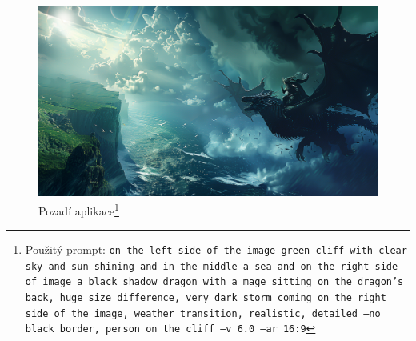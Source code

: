 \begin{figure}
  \begin{minipage}{\textwidth}
    \centering
    \includegraphics[width=\textwidth]{resources/figures/background.png}
    \caption[Pozadí aplikace]{Pozadí aplikace\footnote[3]{Použitý prompt: \texttt{on the left side of the image green cliff with clear sky and sun shining and in the middle a~sea and on the right side of image a~black shadow dragon with a~mage sitting on the dragon's back, huge size difference, very dark storm coming on the right side of the image, weather transition, realistic, detailed --no black border, person on the cliff --v 6.0 --ar 16:9}}}
    \label{fig:background}
  \end{minipage}
\end{figure}

